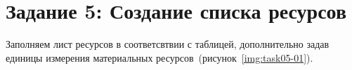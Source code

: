 \section{Задание 5: Создание списка ресурсов}

Заполняем лист ресурсов в соответсвтвии с таблицей, дополнительно задав единицы
измерения материальных ресурсов~(рисунок~\ref{img:task05-01}).

